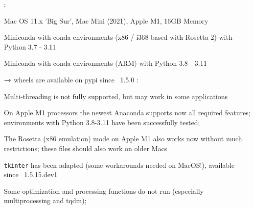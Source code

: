 \noindent {}:
\bi
  \item Mac OS 11.x 'Big Sur', Mac Mini (2021), Apple M1, 16GB Memory
  \item Miniconda with conda environments (x86 / i368 based with Rosetta 2) with Python 3.7 - 3.11
  \item Miniconda with conda environments (ARM) with Python 3.8 - 3.11
  \item[] $\rightarrow$ wheels are available on pypi since \codeName\ 1.5.0 
\ei
\noindent {}:
\bi
  \item Multi-threading is not fully supported, but may work in some applications
  \item On Apple M1 processors the newest Anaconda supports now all required features; environments with Python 3.8-3.11 have been successfully tested;
  \item The Rosetta (x86 emulation) mode on Apple M1 also works now without much restrictions; these files should also work on older Macs
  \item \texttt{tkinter} has been adapted (some workarounds needed on MacOS!), available since \codeName\ 1.5.15.dev1
  \item Some optimization and processing functions do not run (especially multiprocessing and tqdm); 
\ei

